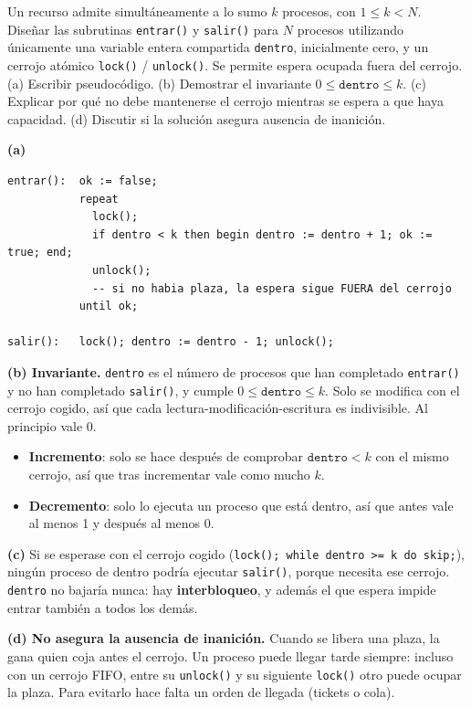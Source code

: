 \documentclass[11pt,a4paper,oneside]{report}
\begin{document}
\begin{ejercicio}
Un recurso admite simultáneamente a lo sumo $k$ procesos, con $1 \le k < N$. Diseñar las subrutinas
\texttt{entrar()} y \texttt{salir()} para $N$ procesos utilizando únicamente una variable entera compartida
\texttt{dentro}, inicialmente cero, y un cerrojo atómico \texttt{lock()} / \texttt{unlock()}. Se permite espera
ocupada fuera del cerrojo. (a) Escribir pseudocódigo. (b) Demostrar el invariante $0 \le \texttt{dentro} \le k$.
(c) Explicar por qué no debe mantenerse el cerrojo mientras se espera a que haya capacidad. (d) Discutir si la
solución asegura ausencia de inanición.
\end{ejercicio}
\begin{solucion}
\textbf{(a)}
\begin{lstlisting}
entrar():  ok := false;
           repeat
             lock();
             if dentro < k then begin dentro := dentro + 1; ok := true; end;
             unlock();
             -- si no habia plaza, la espera sigue FUERA del cerrojo
           until ok;

salir():   lock(); dentro := dentro - 1; unlock();
\end{lstlisting}
\textbf{(b) Invariante.} \texttt{dentro} es el número de procesos que han completado \texttt{entrar()} y no han
completado \texttt{salir()}, y cumple $0 \le \texttt{dentro} \le k$. Solo se modifica con el cerrojo cogido, así
que cada lectura-modificación-escritura es indivisible. Al principio vale $0$.
\begin{itemize}[leftmargin=*,noitemsep]
  \item \textbf{Incremento}: solo se hace después de comprobar $\texttt{dentro} < k$ con el mismo cerrojo, así que
        tras incrementar vale como mucho $k$.
  \item \textbf{Decremento}: solo lo ejecuta un proceso que está dentro, así que antes vale al menos 1 y después
        al menos 0.
\end{itemize}

\textbf{(c)} Si se esperase con el cerrojo cogido (\texttt{lock(); while dentro >= k do skip;}), ningún proceso de
dentro podría ejecutar \texttt{salir()}, porque necesita ese cerrojo. \texttt{dentro} no bajaría nunca: hay
\textbf{interbloqueo}, y además el que espera impide entrar también a todos los demás.

\textbf{(d) No asegura la ausencia de inanición.} Cuando se libera una plaza, la gana quien coja antes el
cerrojo. Un proceso puede llegar tarde siempre: incluso con un cerrojo FIFO, entre su \texttt{unlock()} y su
siguiente \texttt{lock()} otro puede ocupar la plaza. Para evitarlo hace falta un orden de llegada (tickets o
cola).
\end{solucion}
\end{document}
